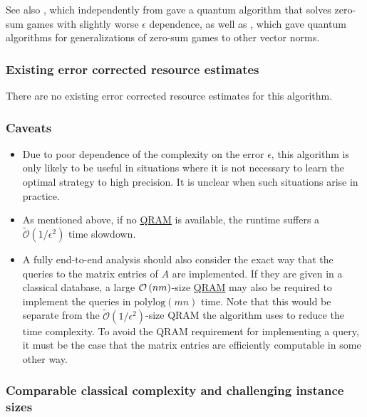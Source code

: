 \begin{refsection}
See also \cite{li2019SublinearClassifiers}, which independently from \cite{apeldoorn2019QAlgorithmsForZeroSumGames} gave a quantum algorithm that solves zero-sum games with slightly worse $\epsilon$ dependence, as well as \cite{li2021sublinearGeneralMatrixGames}, which gave quantum algorithms for generalizations of zero-sum games to other vector norms. 


\subsubsection*{Existing error corrected resource estimates}

There are no existing error corrected resource estimates for this algorithm.

\subsubsection*{Caveats}
\begin{itemize}
    \item Due to poor dependence of the complexity on the error $\epsilon$, this algorithm is only likely to be useful in situations where it is not necessary to learn the optimal strategy to high precision. It is unclear when such situations arise in practice. 
    
    \item As mentioned above, if no \hyperref[prim:QRAM]{QRAM} is available, the runtime suffers a $\tilde{\mathcal{O}}(1/\epsilon^2)$ time slowdown. 
    \item A fully end-to-end analysis should also consider the exact way that the queries to the matrix entries of $A$ are implemented. If they are given in a classical database, a large $\mathcal{O}\left( nm \right)$-size \hyperref[prim:QRAM]{QRAM} may also be required to implement the queries in $\text{polylog}(mn)$ time. Note that this would be separate from the $\tilde{\mathcal{O}}(1/\epsilon^2)$-size QRAM the algorithm uses to reduce the time complexity. To avoid the QRAM  requirement for implementing a query, it must be the case that the matrix entries are efficiently computable in some other way.

\end{itemize}

\subsubsection*{Comparable classical complexity and challenging instance sizes}


\end{refsection}
